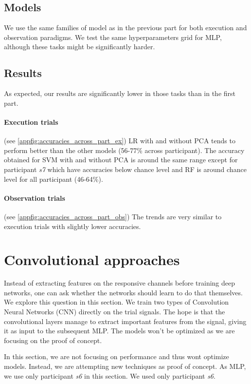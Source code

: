 \documentclass[10pt,conference,compsocconf]{IEEEtran}
\begin{document}
\subsection{Models}
We use the same families of model as in the previous part for both execution and observation paradigms. We test the same hyperparameters grid for MLP, although these tasks might be significantly harder.

\subsection{Results}
As expected, our results are significantly lower in those tasks than in the first part.

\paragraph{Execution trials}
(see \ref{appfig:accuracies_across_part_ex}) LR with and without PCA tends to perform better than the other models (56-77\% across participant). The accuracy obtained for SVM with and without PCA is around the same range except for participant \textit{s7} which have accuracies below chance level and RF is around chance level for all participant (46-64\%).

\paragraph{Observation trials}
(see \ref{appfig:accuracies_across_part_obs}) The trends are very similar to execution trials with slightly lower accuracies.

\section{Convolutional approaches}
\label{sec:deeplearning}
Instead of extracting features on the responsive channels before training deep networks, one can ask whether the networks should learn to do that themselves. We explore this question in this section. We train two types of Convolution Neural Networks (CNN) directly on the trial signals. The hope is that the convolutional layers manage to extract important features from the signal, giving it as input to the subsequent MLP. The models won't be optimized as we are focusing on the proof of concept.

In this section, we are not focusing on performance and thus wont optimize models. Instead, we are attempting new techniques as proof of concept. As MLP, we use only participant \textit{s6} in this section. We used only participant \textit{s6}.
\end{document}
